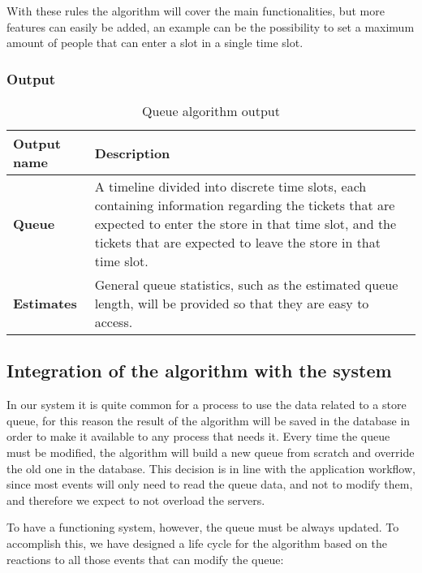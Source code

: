 With these rules the algorithm will cover the main functionalities, but more features can easily be added, an example can be the possibility to set a maximum amount of people that can enter a slot in a single time slot.


\subsubsection{Output}
\label{subsubsect:Output}

\begin{table}[h!]
    \centering
    \begin{tabular}{@{}P{0.13\textwidth}P{0.85\textwidth}@{}}
        \toprule
        \textbf{Output name}& \textbf{Description}\\
        \midrule
        \textbf{Queue}                & A timeline divided into discrete time slots, each containing information regarding the tickets that are expected to enter the store in that time slot, and the tickets that are expected to leave the store in that time slot.\\
        \textbf{Estimates}            & General queue statistics, such as the estimated queue length, will be provided so that they are easy to access.\\
        \bottomrule
    \end{tabular}
\caption{Queue algorithm output}
\label{table:output}
\end{table}

\subsection{Integration of the algorithm with the system}
\label{subsubsect:integrationofthealgorithmintothesystem}

In our system it is quite common for a process to use the data related to a store queue, for this reason the result of the algorithm will be saved in the database in order to make it available to any process that needs it. Every time the queue must be modified, the algorithm will build a new queue from scratch and override the old one in the database. This decision is in line with the application workflow, since most events will only need to read the queue data, and not to modify them, and therefore we expect to not overload the servers.

To have a functioning system, however, the queue must be always updated. To accomplish this, we have designed a life cycle for the algorithm based on the reactions to all those events that can modify the queue:

